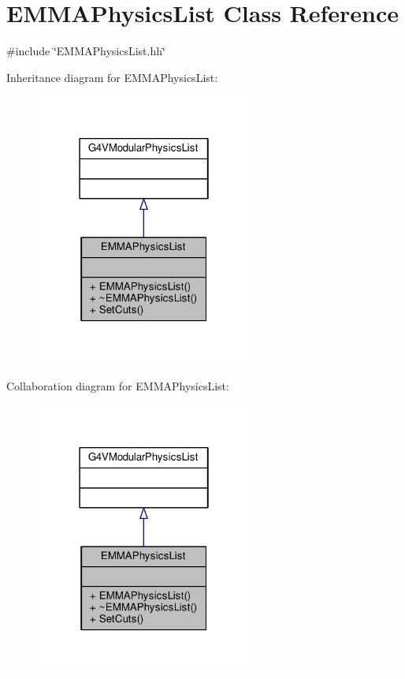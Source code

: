 \hypertarget{classEMMAPhysicsList}{}\section{E\+M\+M\+A\+Physics\+List Class Reference}
\label{classEMMAPhysicsList}


{\ttfamily \#include \char`\"{}E\+M\+M\+A\+Physics\+List.\+hh\char`\"{}}



Inheritance diagram for E\+M\+M\+A\+Physics\+List\+:
\nopagebreak
\begin{figure}[H]
\begin{center}
\leavevmode
\includegraphics[width=202pt]{classEMMAPhysicsList__inherit__graph}
\end{center}
\end{figure}


Collaboration diagram for E\+M\+M\+A\+Physics\+List\+:
\nopagebreak
\begin{figure}[H]
\begin{center}
\leavevmode
\includegraphics[width=202pt]{classEMMAPhysicsList__coll__graph}
\end{center}
\end{figure}
